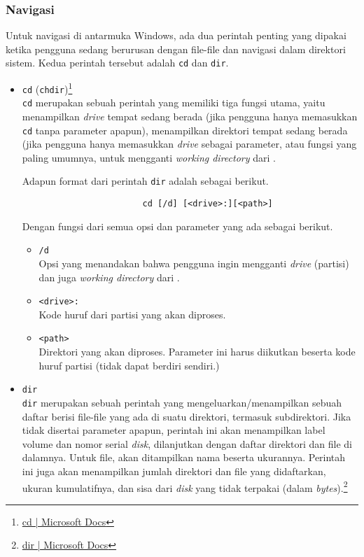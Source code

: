 \subsubsection{Navigasi}
\label{sec:commandline-windows-nav}

Untuk navigasi di antarmuka \cl Windows, ada dua perintah penting yang dipakai ketika pengguna sedang berurusan dengan file-file dan navigasi dalam direktori sistem. Kedua perintah tersebut adalah \verb|cd| dan \verb|dir|.

\begin{itemize}
	\item \verb|cd| (\verb|chdir|)\footnote{\href{https://docs.microsoft.com/en-us/windows-server/administration/windows-commands/cd}{cd | Microsoft Docs}}\\
	\verb|cd| merupakan sebuah perintah yang memiliki tiga fungsi utama, yaitu menampilkan \textit{drive} tempat sedang \cl berada (jika pengguna hanya memasukkan \verb|cd| tanpa parameter apapun), menampilkan direktori tempat \cl sedang berada (jika pengguna hanya memasukkan \textit{drive} sebagai parameter, atau fungsi yang paling umumnya, untuk mengganti \textit{working directory} dari \cl.
	
	Adapun format dari perintah \verb|dir| adalah sebagai berikut.
	
	\begin{verbatim}
                        cd [/d] [<drive>:][<path>]
	\end{verbatim}
	
	Dengan fungsi dari semua opsi dan parameter yang ada sebagai berikut.
	
	\begin{itemize}
		\item \verb|/d|\\
		Opsi yang menandakan bahwa pengguna ingin mengganti \textit{drive} (partisi) dan juga \textit{working directory} dari \cl.
		\item \verb|<drive>:|\\
		Kode huruf dari partisi yang akan diproses.
		\item \verb|<path>|\\
		Direktori yang akan diproses. Parameter ini harus diikutkan beserta kode huruf partisi (tidak dapat berdiri sendiri.)
	\end{itemize}
	
	\item \verb|dir|\\
	\verb|dir| merupakan sebuah perintah yang mengeluarkan/menampilkan sebuah daftar berisi file-file yang ada di suatu direktori, termasuk subdirektori. Jika tidak disertai parameter apapun, perintah ini akan menampilkan label volume dan nomor serial \textit{disk}, dilanjutkan dengan daftar direktori dan file di dalamnya. Untuk file, akan ditampilkan nama beserta ukurannya. Perintah ini juga akan menampilkan jumlah direktori dan file yang didaftarkan, ukuran kumulatifnya, dan sisa dari \textit{disk} yang tidak terpakai (dalam \textit{bytes}).\footnote{\href{https://docs.microsoft.com/en-us/windows-server/administration/windows-commands/dir}{dir | Microsoft Docs}}
	

\end{itemize}
